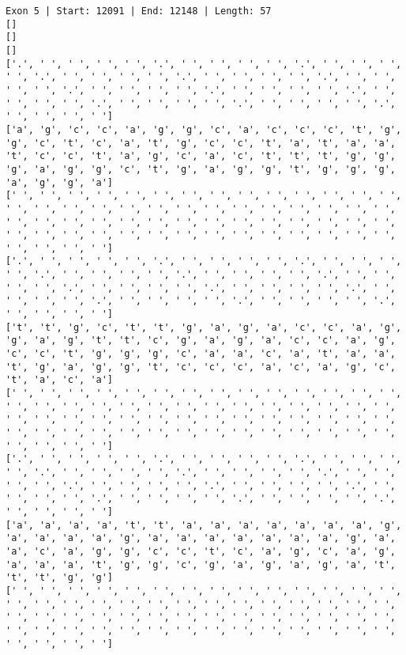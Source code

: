 \documentclass{article}
\begin{document}
\begin{Verbatim}
Exon 5 | Start: 12091 | End: 12148 | Length: 57
[]
[]
[]
['.', ' ', ' ', ' ', ' ', '.', ' ', ' ', ' ', ' ', '.', ' ', ' ', ' ', ' ', '.', ' ', ' ', ' ', ' ', '.', ' ', ' ', ' ', ' ', '.', ' ', ' ', ' ', ' ', '.', ' ', ' ', ' ', ' ', '.', ' ', ' ', ' ', ' ', '.', ' ', ' ', ' ', ' ', '.', ' ', ' ', ' ', ' ', '.', ' ', ' ', ' ', ' ', '.', ' ', ' ', ' ', ' ']
['a', 'g', 'c', 'c', 'a', 'g', 'g', 'c', 'a', 'c', 'c', 'c', 't', 'g', 'g', 'c', 't', 'c', 'a', 't', 'g', 'c', 'c', 't', 'a', 't', 'a', 'a', 't', 'c', 'c', 't', 'a', 'g', 'c', 'a', 'c', 't', 't', 't', 'g', 'g', 'g', 'a', 'g', 'g', 'c', 't', 'g', 'a', 'g', 'g', 't', 'g', 'g', 'g', 'a', 'g', 'g', 'a']
[' ', ' ', ' ', ' ', ' ', ' ', ' ', ' ', ' ', ' ', ' ', ' ', ' ', ' ', ' ', ' ', ' ', ' ', ' ', ' ', ' ', ' ', ' ', ' ', ' ', ' ', ' ', ' ', ' ', ' ', ' ', ' ', ' ', ' ', ' ', ' ', ' ', ' ', ' ', ' ', ' ', ' ', ' ', ' ', ' ', ' ', ' ', ' ', ' ', ' ', ' ', ' ', ' ', ' ', ' ', ' ', ' ', ' ', ' ', ' ']
['.', ' ', ' ', ' ', ' ', '.', ' ', ' ', ' ', ' ', '.', ' ', ' ', ' ', ' ', '.', ' ', ' ', ' ', ' ', '.', ' ', ' ', ' ', ' ', '.', ' ', ' ', ' ', ' ', '.', ' ', ' ', ' ', ' ', '.', ' ', ' ', ' ', ' ', '.', ' ', ' ', ' ', ' ', '.', ' ', ' ', ' ', ' ', '.', ' ', ' ', ' ', ' ', '.', ' ', ' ', ' ', ' ']
['t', 't', 'g', 'c', 't', 't', 'g', 'a', 'g', 'a', 'c', 'c', 'a', 'g', 'g', 'a', 'g', 't', 't', 'c', 'g', 'a', 'g', 'a', 'c', 'c', 'a', 'g', 'c', 'c', 't', 'g', 'g', 'g', 'c', 'a', 'a', 'c', 'a', 't', 'a', 'a', 't', 'g', 'a', 'g', 'g', 't', 'c', 'c', 'c', 'a', 'c', 'a', 'g', 'c', 't', 'a', 'c', 'a']
[' ', ' ', ' ', ' ', ' ', ' ', ' ', ' ', ' ', ' ', ' ', ' ', ' ', ' ', ' ', ' ', ' ', ' ', ' ', ' ', ' ', ' ', ' ', ' ', ' ', ' ', ' ', ' ', ' ', ' ', ' ', ' ', ' ', ' ', ' ', ' ', ' ', ' ', ' ', ' ', ' ', ' ', ' ', ' ', ' ', ' ', ' ', ' ', ' ', ' ', ' ', ' ', ' ', ' ', ' ', ' ', ' ', ' ', ' ', ' ']
['.', ' ', ' ', ' ', ' ', '.', ' ', ' ', ' ', ' ', '.', ' ', ' ', ' ', ' ', '.', ' ', ' ', ' ', ' ', '.', ' ', ' ', ' ', ' ', '.', ' ', ' ', ' ', ' ', '.', ' ', ' ', ' ', ' ', '.', ' ', ' ', ' ', ' ', '.', ' ', ' ', ' ', ' ', '.', ' ', ' ', ' ', ' ', '.', ' ', ' ', ' ', ' ', '.', ' ', ' ', ' ', ' ']
['a', 'a', 'a', 'a', 't', 't', 'a', 'a', 'a', 'a', 'a', 'a', 'a', 'g', 'a', 'a', 'a', 'a', 'g', 'a', 'a', 'a', 'a', 'a', 'a', 'a', 'g', 'a', 'a', 'c', 'a', 'g', 'g', 'c', 'c', 't', 'c', 'a', 'g', 'c', 'a', 'g', 'a', 'a', 'a', 't', 'g', 'g', 'c', 'g', 'a', 'g', 'a', 'g', 'a', 't', 't', 't', 'g', 'g']
[' ', ' ', ' ', ' ', ' ', ' ', ' ', ' ', ' ', ' ', ' ', ' ', ' ', ' ', ' ', ' ', ' ', ' ', ' ', ' ', ' ', ' ', ' ', ' ', ' ', ' ', ' ', ' ', ' ', ' ', ' ', ' ', ' ', ' ', ' ', ' ', ' ', ' ', ' ', ' ', ' ', ' ', ' ', ' ', ' ', ' ', ' ', ' ', ' ', ' ', ' ', ' ', ' ', ' ', ' ', ' ', ' ', ' ', ' ', ' ']

\end{Verbatim}
\end{document}
